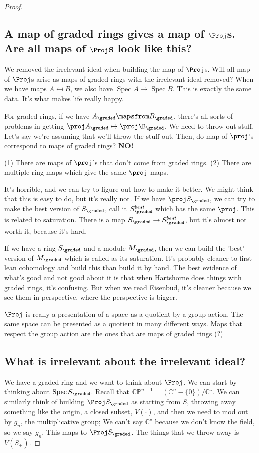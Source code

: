 \documentclass{book}
\newcommand{\C}{\ensuremath{\mathbb{C}}}
\newcommand{\CP}{\ensuremath{\mathbb{CP}}}
\newcommand{\Spec}{\operatorname{Spec}}
\newcommand{\spec}{\operatorname{Spec}}
\theoremstyle{definition}
\begin{document}
\begin{proof}
\subsection{A map of graded rings gives a map of $\Proj$s. Are all maps of $\Proj$s look like this?}
We removed the irrelevant ideal when building the map of $\Proj$s. Will all map 
of $\Proj$s arise as maps of graded rings with the irrelevant ideal removed?
When we have maps $A \mapsfrom B$, we also have $\spec A \rightarrow \spec B$. This
is exactly the same data. It's what makes life really happy.

For graded rings, if we have $A_\graded \mapsfrom B_\graded$, there's all sorts
of problems in getting $\proj A_\graded \mapsto \proj \B_\graded$. We need to
throw out stuff. Let's say we're assuming that we'll throw the stuff out. 
Then, do map of $\proj$'s correspond to maps of graded rings? \textbf{NO!}

(1) There are maps of $\proj$'s that don't come from graded rings. (2)
There are multiple ring maps which give the same $\proj$ maps.

It's horrible, and we can try to figure out how to make it better. We might
think that this is easy to do, but it's really not. If we have $\proj S_\graded$,
we can try to make the best version of $S_\graded$, call it $S^{best}_\graded$ 
which has the same $\proj$. This is related to saturation. There is a map
$S_\graded \rightarrow S^{best}_\graded$, but it's almost not worth it,
because it's hard.

If we have a ring $S_\graded$ and a module $M_\graded$, then we can build the
'best' version of $M_\graded$ which is called as its saturation. It's probably
cleaner to first lean cohomology and build this than build it by hand. The
best evidence of what's good and not good about it is that when Hartshorne
does things with graded rings, it's confusing. But when we read Eisenbud,
it's cleaner because we see them in perspective, where the perspective is
bigger.

$\Proj$ is really a presentation of a space as a quotient by a group action.
The same space can be presented as a quotient in many different ways. Maps that
respect the group action are the ones that are maps of graded rings (?)


\subsection{What is irrelevant about the irrelevant ideal?}
We have a graded ring and we want to think about $\Proj$. We can start
by thinking about $\Spec S_\graded$. Recall that $\CP^{n-1} = (\C^n - \{0\}) / \C^\star$.
We can similarly think of building $\Proj S_\graded$ as starting from 
$S$, throwing away something like the origin, a closed subset, $V(\cdot)$,
and then we need to mod out by $g_n$, the multiplicative group; We can't say $\C^\star$
because we don't know the field, so we say $g_n$. This maps to $\Proj S_\graded$.
The things that we throw away is $V(S_+)$.



\end{proof}
\end{document}
